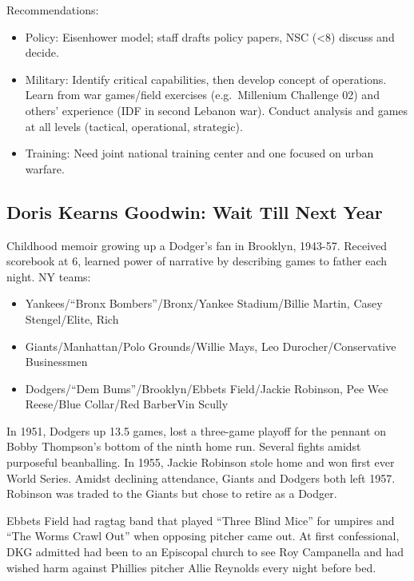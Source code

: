 \documentclass[
]{article}
\begin{document}
Recommendations:

\begin{itemize}
\item
  Policy: Eisenhower model; staff drafts policy papers, NSC (\textless8)
  discuss and decide.
\item
  Military: Identify critical capabilities, then develop concept of
  operations. Learn from war games/field exercises (e.g.~Millenium
  Challenge 02) and others' experience (IDF in second Lebanon war).
  Conduct analysis and games at all levels (tactical, operational,
  strategic).
\item
  Training: Need joint national training center and one focused on urban
  warfare.
\end{itemize}

\hypertarget{doris-kearns-goodwin-wait-till-next-year}{%
\subsection{Doris Kearns Goodwin: Wait Till Next
Year}\label{doris-kearns-goodwin-wait-till-next-year}}

Childhood memoir growing up a Dodger's fan in Brooklyn, 1943-57.
Received scorebook at 6, learned power of narrative by describing games
to father each night. NY teams:

\begin{itemize}
\item
  Yankees/``Bronx Bombers''/Bronx/Yankee Stadium/Billie Martin, Casey
  Stengel/Elite, Rich
\item
  Giants/Manhattan/Polo Grounds/Willie Mays, Leo Durocher/Conservative
  Businessmen
\item
  Dodgers/``Dem Bums''/Brooklyn/Ebbets Field/Jackie Robinson, Pee Wee
  Reese/Blue Collar/Red BarberVin Scully
\end{itemize}

In 1951, Dodgers up 13.5 games, lost a three-game playoff for the
pennant on Bobby Thompson's bottom of the ninth home run. Several fights
amidst purposeful beanballing. In 1955, Jackie Robinson stole home and
won first ever World Series. Amidst declining attendance, Giants and
Dodgers both left 1957. Robinson was traded to the Giants but chose to
retire as a Dodger.

Ebbets Field had ragtag band that played ``Three Blind Mice'' for
umpires and ``The Worms Crawl Out'' when opposing pitcher came out. At
first confessional, DKG admitted had been to an Episcopal church to see
Roy Campanella and had wished harm against Phillies pitcher Allie
Reynolds every night before bed.
\end{document}
